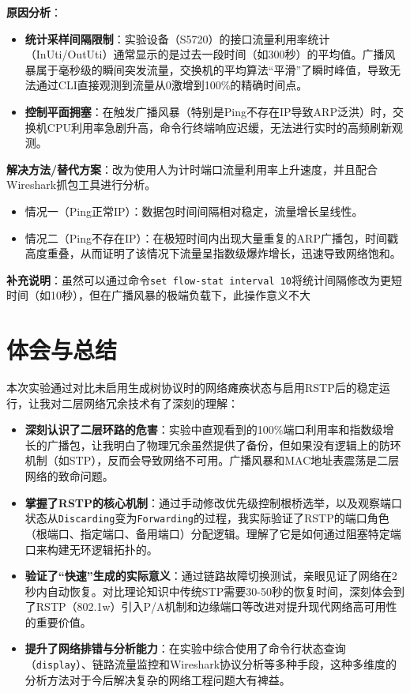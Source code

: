 \documentclass[a4paper]{article}
\begin{document}
\begin{enumerate}
    \textbf{原因分析}：
    \begin{itemize}
        \item \textbf{统计采样间隔限制}：实验设备（S5720）的接口流量利用率统计（InUti/OutUti）通常显示的是过去一段时间（如300秒）的平均值。广播风暴属于毫秒级的瞬间突发流量，交换机的平均算法“平滑”了瞬时峰值，导致无法通过CLI直接观测到流量从0激增到100\%的精确时间点。
        \item \textbf{控制平面拥塞}：在触发广播风暴（特别是Ping不存在IP导致ARP泛洪）时，交换机CPU利用率急剧升高，命令行终端响应迟缓，无法进行实时的高频刷新观测。
    \end{itemize}

    \textbf{解决方法/替代方案}：改为使用人为计时端口流量利用率上升速度，并且配合Wireshark抓包工具进行分析。
    \begin{itemize}
        \item 情况一（Ping正常IP）：数据包时间间隔相对稳定，流量增长呈线性。
        \item 情况二（Ping不存在IP）：在极短时间内出现大量重复的ARP广播包，时间戳高度重叠，从而证明了该情况下流量呈指数级爆炸增长，迅速导致网络饱和。
    \end{itemize}

    \textbf{补充说明}：虽然可以通过命令\texttt{set flow-stat interval 10}将统计间隔修改为更短时间（如10秒），但在广播风暴的极端负载下，此操作意义不大
\end{enumerate}

\section{体会与总结}

本次实验通过对比未启用生成树协议时的网络瘫痪状态与启用RSTP后的稳定运行，让我对二层网络冗余技术有了深刻的理解：

\begin{itemize}
    \item \textbf{深刻认识了二层环路的危害}：实验中直观看到的100\%端口利用率和指数级增长的广播包，让我明白了物理冗余虽然提供了备份，但如果没有逻辑上的防环机制（如STP），反而会导致网络不可用。广播风暴和MAC地址表震荡是二层网络的致命问题。
    
    \item \textbf{掌握了RSTP的核心机制}：通过手动修改优先级控制根桥选举，以及观察端口状态从\texttt{Discarding}变为\texttt{Forwarding}的过程，我实际验证了RSTP的端口角色（根端口、指定端口、备用端口）分配逻辑。理解了它是如何通过阻塞特定端口来构建无环逻辑拓扑的。
    
    \item \textbf{验证了“快速”生成的实际意义}：通过链路故障切换测试，亲眼见证了网络在2秒内自动恢复。对比理论知识中传统STP需要30-50秒的恢复时间，深刻体会到了RSTP（802.1w）引入P/A机制和边缘端口等改进对提升现代网络高可用性的重要价值。
    
    \item \textbf{提升了网络排错与分析能力}：在实验中综合使用了命令行状态查询（\texttt{display}）、链路流量监控和Wireshark协议分析等多种手段，这种多维度的分析方法对于今后解决复杂的网络工程问题大有裨益。
\end{itemize}
\end{document}
